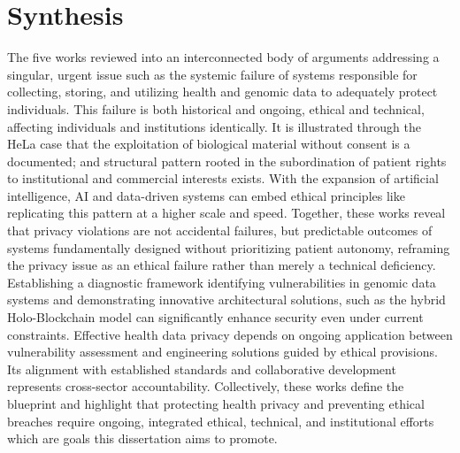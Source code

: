 \documentclass[12pt]{article}
\begin{document}
\section{Synthesis}
The five works reviewed into an interconnected body of arguments addressing a singular, urgent issue such as the systemic failure of systems responsible for collecting, storing, and utilizing health and genomic data to adequately protect individuals. This failure is both historical and ongoing, ethical and technical, affecting individuals and institutions identically. It is illustrated through the HeLa case that the exploitation of biological material without consent is a documented; and structural pattern rooted in the subordination of patient rights to institutional and commercial interests exists. With the expansion of artificial intelligence, AI and data-driven systems can embed ethical principles like replicating this pattern at a higher scale and speed. Together, these works reveal that privacy violations are not accidental failures, but predictable outcomes of systems fundamentally designed without prioritizing patient autonomy, reframing the privacy issue as an ethical failure rather than merely a technical deficiency. Establishing a diagnostic framework identifying vulnerabilities in genomic data systems and demonstrating innovative architectural solutions, such as the hybrid Holo-Blockchain model can significantly enhance security even under current constraints. Effective health data privacy depends on ongoing application between vulnerability assessment and engineering solutions guided by ethical provisions. Its alignment with established standards and collaborative development represents cross-sector accountability. Collectively, these works define the blueprint and highlight that protecting health privacy and preventing ethical breaches require ongoing, integrated ethical, technical, and institutional efforts which are goals this dissertation aims to promote.



\end{document}
